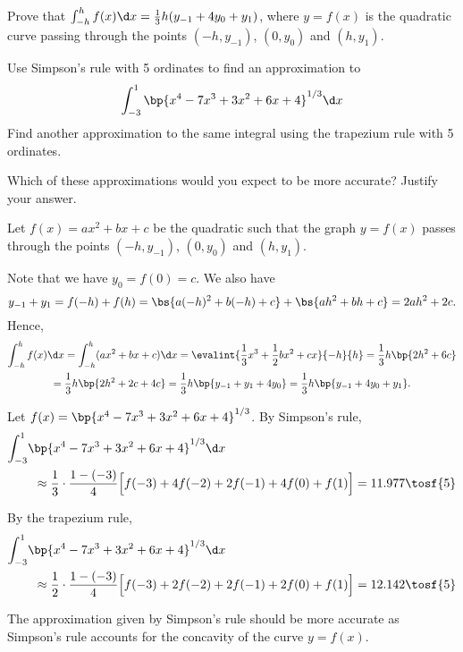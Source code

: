 \begin{problem}
    Prove that $\int_{-h}^h f(x) \d x = \frac13 h (y_{-1} + 4y_0 + y_1)$, where $y = f(x)$ is the quadratic curve passing through the points $(-h, y_{-1})$, $(0, y_0)$ and $(h, y_1)$.

    Use Simpson's rule with 5 ordinates to find an approximation to \[\int_{-3}^1 \bp{x^4 - 7x^3 + 3x^2 + 6x + 4}^{1/3} \d x\] Find another approximation to the same integral using the trapezium rule with 5 ordinates.

    Which of these approximations would you expect to be more accurate? Justify your answer.
\end{problem}
\begin{solution}
    Let $f(x) = ax^2 + bx + c$ be the quadratic such that the graph $y = f(x)$ passes through the points $(-h, y_{-1})$, $(0, y_0)$ and $(h, y_1)$.

    Note that we have $y_0 = f(0) = c$. We also have \[y_{-1} + y_1 = f(-h) + f(h) = \bs{a(-h)^2 + b(-h) + c} + \bs{ah^2 + bh + c} = 2ah^2 + 2c.\] Hence,
    \begin{gather*}
        \int_{-h}^h f(x) \d x = \int_{-h}^h (ax^2 + bx + c) \d x = \evalint{\frac13 x^3 + \frac12 bx^2 + cx}{-h}{h}= \frac13 h \bp{2h^2 + 6c}\\
        = \frac13 h \bp{2h^2 + 2c + 4c} = \frac13 h \bp{y_{-1} + y_1 + 4y_0} = \frac13 h \bp{y_{-1} + 4y_0 + y_1}.
    \end{gather*}

    Let $f(x) = \bp{x^4 - 7x^3 + 3x^2 + 6x + 4}^{1/3}$. By Simpson's rule,
    \begin{align*}
        \int_{-3}^1 &\bp{x^4 - 7x^3 + 3x^2 + 6x + 4}^{1/3} \d x\\
        &\hspace{0.5em}\approx \frac13 \cdot \frac{1-(-3)}{4} \Big[f(-3) + 4f(-2) + 2f(-1) + 4f(0) + f(1)\Big] = 11.977 \tosf{5}
    \end{align*}

    By the trapezium rule,
    \begin{align*}
        \int_{-3}^1 &\bp{x^4 - 7x^3 + 3x^2 + 6x + 4}^{1/3} \d x\\
        &\hspace{0.5em}\approx \frac12 \cdot \frac{1-(-3)}{4} \Big[f(-3) + 2f(-2) + 2f(-1) + 2f(0) + f(1)\Big] = 12.142 \tosf{5}
    \end{align*}

    The approximation given by Simpson's rule should be more accurate as Simpson's rule accounts for the concavity of the curve $y = f(x)$.
\end{solution}


